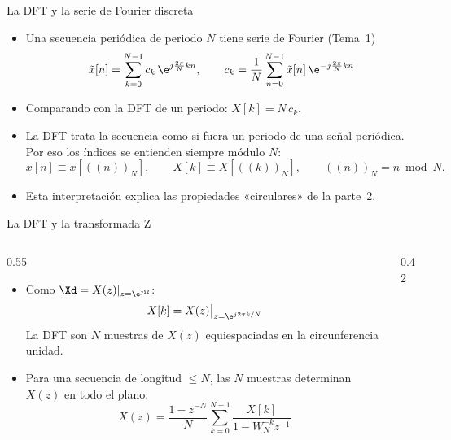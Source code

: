 \documentclass[aspectratio=169,11pt]{beamer}
\begin{document}
\begin{frame}{La DFT y la serie de Fourier discreta}
  \begin{itemize}
    \item Una secuencia periódica de periodo $N$ tiene serie de Fourier (Tema~1)
    \[
      \tilde x[n]=\sum_{k=0}^{N-1}c_k\,\e^{j\frac{2\pi}{N}kn},\qquad c_k=\frac1N\sum_{n=0}^{N-1}\tilde x[n]\,\e^{-j\frac{2\pi}{N}kn}
    \]
    \item Comparando con la DFT de un periodo: \alert{$X[k]=N\,c_k$}.
    \item La DFT trata la secuencia como si fuera \alert{un periodo de una señal periódica}. Por eso los índices se entienden siempre módulo $N$:
    \[
      x[n]\equiv x[((n))_N],\qquad X[k]\equiv X[((k))_N],\qquad ((n))_N=n\bmod N.
    \]
    \item Esta interpretación explica las propiedades «circulares» de la parte~2.
  \end{itemize}
\end{frame}

\begin{frame}{La DFT y la transformada Z}
  \begin{columns}[c]
    \begin{column}{0.55\textwidth}
      \begin{itemize}
        \item Como $\Xd=X(z)|_{z=\e^{j\Omega}}$:
        \[
          X[k]=X(z)\big|_{z=\e^{j2\pi k/N}}
        \]
        La DFT son $N$ muestras de $X(z)$ \alert{equiespaciadas en la circunferencia unidad}.
        \item Para una secuencia de longitud $\le N$, las $N$ muestras determinan $X(z)$ en todo el plano:
        \[
          X(z)=\frac{1-z^{-N}}{N}\sum_{k=0}^{N-1}\frac{X[k]}{1-W_N^{-k}z^{-1}}
        \]
      \end{itemize}
    \end{column}
    \begin{column}{0.42\textwidth}
      \begin{center}
      \end{center}
    \end{column}
  \end{columns}
\end{frame}
\end{document}
